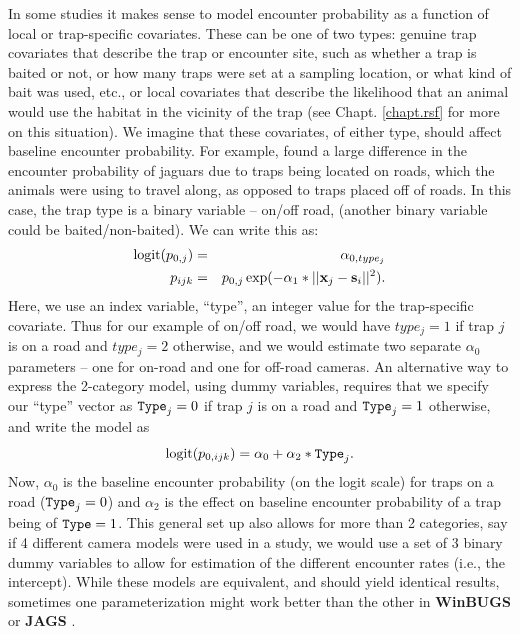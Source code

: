 In some studies it makes sense to model encounter probability as a
function of local or trap-specific covariates. These can be one of two
types: genuine trap covariates that describe the trap or encounter site,
such as whether a trap is baited or not, or how many traps were set at a sampling location,
or what kind of bait was used, etc., or local covariates that
describe the likelihood that an animal would use the habitat in the
vicinity of the trap (see Chapt. \ref{chapt.rsf} for more on this situation).
We imagine that these covariates, of either type, should affect
baseline encounter probability.
For example, \citet{sollmann_etal:2011}
found a large difference in the encounter probability of jaguars due to traps
being located on roads, which the animals were using to travel along, as
opposed to traps placed off of roads.  In this case, the trap
type is a binary variable -- on/off road,
(another binary variable could be baited/non-baited).  We can write
this 
as:
\begin{eqnarray*}
\mbox{logit}(p_{0,j}) &= &\alpha_{0,type_j}  \\
p_{ijk}  & = & p_{0,j} \exp(- \alpha_1*||{\bf x}_{j}-{\bf s}_{i}||^2).
\end{eqnarray*}
Here, we use an index variable, ``type'', an integer 
value for the trap-specific covariate. 
Thus for our example of on/off
road, we would have $type_j = 1$ if trap $j$ is on a road and $type_j =
2$ otherwise, and we would estimate two separate $\alpha_{0}$
parameters -- one for
on-road and one for off-road cameras.  
An alternative way to express the 2-category model, using dummy variables, 
requires that we
specify our ``type'' vector as $\mbox{\tt Type}_j = 0$ if trap $j$ is on a road and
$\mbox{\tt Type}_j = 1$ otherwise, and write the model as
\[
\mbox{logit}(p_{0,ijk}) = \alpha_{0} + \alpha_{2} * \mbox{\tt Type}_{j}.
\]
Now, $\alpha_{0}$ is the baseline encounter probability (on the logit
scale) for traps on a road ($\mbox{\tt Type}_j = 0$) and $\alpha_{2}$ is the effect on
baseline encounter probability 
of a trap being of $\mbox{\tt Type} = 1$.   This general set up also allows
for more than 2 categories, say if  4 different camera models were
used in a study, we would use a set of 3 binary dummy variables to
allow for
estimation of the different encounter rates (i.e., the intercept).  While these models are
equivalent, and should
yield identical results, sometimes one parameterization might work
better than the other in {\bf WinBUGS} or {\bf JAGS}
\citep{kery:2010}.

